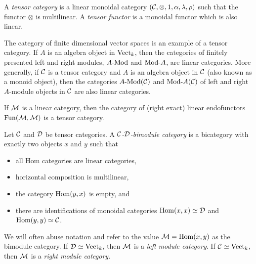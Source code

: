 \documentclass{amsart}
\begin{document}
\begin{definition}
	A {\em tensor category} is a linear monoidal category $(\mathcal C, \otimes, 1, \alpha, \lambda, \rho)$ such that the functor $\otimes$ is multilinear. A {\em tensor functor} is a monoidal functor which is also linear.
\end{definition}

\begin{example}
	The category of finite dimensional vector spaces is an example of a tensor category. If $A$ is an algebra object in $\mathrm{Vect}_k$, then the categories of finitely presented left and right modules, $\Mod{A}{}$ and $\Mod{}{A}$, are linear categories. More generally, if $\mathcal C$ is a tensor category and $A$ is an algebra object in $\mathcal C$ (also known as a monoid object), then the categories $\Mod{A}{}(\cC)$ and $\Mod{}{A}(\cC)$ of left and right $A$-module objects in $\mathcal C$ are also linear categories.
\end{example}

\begin{example}
	If $\mathcal M$ is a linear category, then the category of (right exact) linear endofunctors $\operatorname{Fun}(\mathcal M, \mathcal M)$ is a tensor category. 
\end{example}

\begin{definition}
	Let $\mathcal C$ and $\mathcal D$ be tensor categories. A {\em $\mathcal C$-$\mathcal D$-bimodule category} is a bicategory with exactly two objects $x$ and $y$ such that 
	\begin{itemize}
		\item all Hom categories are linear categories, 
		\item horizontal composition is multilinear,
		\item the category $\operatorname{Hom}(y,x)$ is empty, and
		\item there are identifications of monoidal categories $\operatorname{Hom}(x,x) \simeq \mathcal D$ and $\operatorname{Hom}(y,y) \simeq \mathcal C$.
	\end{itemize} 
	We will often abuse notation and refer to the value $\mathcal M = \operatorname{Hom}(x,y)$ as the bimodule category. If $\mathcal D \simeq \mathrm{Vect}_k$, then $\mathcal M$ is a {\em left module category}. If $\mathcal C \simeq \mathrm{Vect}_k$, then $\mathcal M$ is a {\em right module category}.
\end{definition}
	
\end{document}
